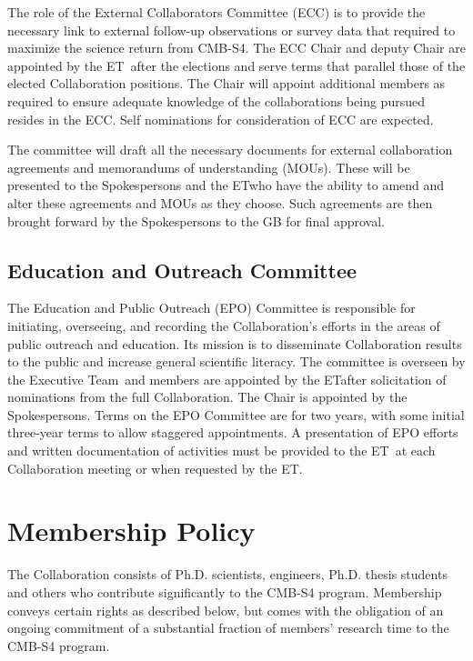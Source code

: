 \documentclass[12pt]{article}
\newcommand{\Comment}[1]{\textcolor{Blue}{(Comment: #1)}}
\newcommand{\exec}{{Executive Team}}
\newcommand{\shorte}{{ET}}  %
\begin{document}
The role of the External Collaborators Committee (ECC) is to provide the necessary link to external follow-up observations or survey data that required to maximize the science return from CMB-S4. The ECC Chair and deputy Chair are appointed by the \shorte\ after the elections and serve terms that parallel those of the elected Collaboration positions. The Chair will appoint additional members as required to ensure adequate knowledge of the collaborations being pursued resides in the ECC. Self nominations for consideration of ECC are expected. 

The committee will draft all the necessary documents for external collaboration agreements and memorandums of understanding (MOUs). These will be presented to the Spokespersons and the  \shorte who have the ability to amend and alter these agreements and MOUs as they choose. Such agreements are then brought forward by the Spokespersons to the GB for final approval. %

\subsection{Education and Outreach Committee}

The Education and Public Outreach (EPO) Committee is responsible for initiating, overseeing, and recording the Collaboration's efforts in the areas of public outreach and education. Its mission is to disseminate Collaboration results to the public and increase general scientific literacy. The committee is overseen by the \exec \ and members are appointed by the \shorte after solicitation of nominations from the full Collaboration. The Chair is appointed by the Spokespersons. Terms on the EPO Committee are for two years, with some initial three-year terms to allow staggered appointments.   A presentation of EPO efforts and written documentation of activities must be provided to the \shorte\ at each Collaboration meeting or when requested by the \shorte. 

\section{Membership Policy}

The Collaboration consists of Ph.D. scientists, engineers, Ph.D. thesis students %
and others who contribute significantly to the CMB-S4 program. Membership conveys certain rights as described below, but comes with the obligation of an ongoing commitment of a substantial fraction of members' research time to the CMB-S4 program.
\end{document}

